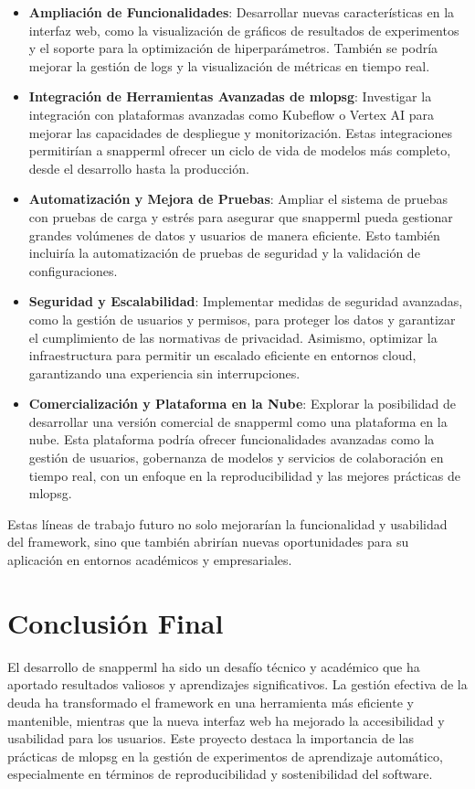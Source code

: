 \begin{itemize}
    \item \textbf{Ampliación de Funcionalidades}: Desarrollar nuevas características en la interfaz web, como la visualización de gráficos de resultados de experimentos y el soporte para la optimización de hiperparámetros. También se podría mejorar la gestión de logs y la visualización de métricas en tiempo real.
    \item \textbf{Integración de Herramientas Avanzadas de \Gls{mlopsg}}: Investigar la integración con plataformas avanzadas como Kubeflow o Vertex AI para mejorar las capacidades de despliegue y monitorización. Estas integraciones permitirían a \Gls{snapperml} ofrecer un ciclo de vida de modelos más completo, desde el desarrollo hasta la producción.
    \item \textbf{Automatización y Mejora de Pruebas}: Ampliar el sistema de pruebas con pruebas de carga y estrés para asegurar que \Gls{snapperml} pueda gestionar grandes volúmenes de datos y usuarios de manera eficiente. Esto también incluiría la automatización de pruebas de seguridad y la validación de configuraciones.
    \item \textbf{Seguridad y Escalabilidad}: Implementar medidas de seguridad avanzadas, como la gestión de usuarios y permisos, para proteger los datos y garantizar el cumplimiento de las normativas de privacidad. Asimismo, optimizar la infraestructura para permitir un escalado eficiente en entornos cloud, garantizando una experiencia sin interrupciones.
    \item \textbf{Comercialización y Plataforma en la Nube}: Explorar la posibilidad de desarrollar una versión comercial de \Gls{snapperml} como una plataforma en la nube. Esta plataforma podría ofrecer funcionalidades avanzadas como la gestión de usuarios, gobernanza de modelos y servicios de colaboración en tiempo real, con un enfoque en la reproducibilidad y las mejores prácticas de \Gls{mlopsg}.
\end{itemize}
Estas líneas de trabajo futuro no solo mejorarían la funcionalidad y usabilidad del \gls{framework}, sino que también abrirían nuevas oportunidades para su aplicación en entornos académicos y empresariales.

\section{Conclusión Final}
El desarrollo de \Gls{snapperml} ha sido un desafío técnico y académico que ha aportado resultados valiosos y aprendizajes significativos. La gestión efectiva de la \gls{deuda} ha transformado el \gls{framework} en una herramienta más eficiente y mantenible, mientras que la nueva interfaz web ha mejorado la accesibilidad y usabilidad para los usuarios. Este proyecto destaca la importancia de las prácticas de \Gls{mlopsg} en la gestión de experimentos de aprendizaje automático, especialmente en términos de reproducibilidad y sostenibilidad del software.

